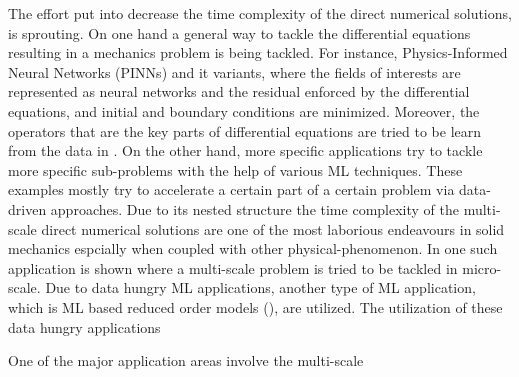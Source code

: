 The effort put into decrease the time complexity of the direct numerical solutions, is sprouting. On one hand a general way to tackle the differential equations resulting in a mechanics problem is being tackled. For instance,  Physics-Informed Neural Networks (PINNs) \cite{raissi2019b} and it variants, where the fields of interests are represented as neural networks and the residual enforced by the differential equations, and initial and boundary conditions are minimized.  Moreover, the operators that are the key parts of differential equations are tried to be learn from the data in \cite{lu2021a}. On the other hand, more specific applications try to tackle more specific sub-problems with the help of various ML techniques. These examples mostly try to accelerate a certain part of a certain problem via data-driven approaches. Due to its nested structure the time complexity of the multi-scale direct numerical solutions are one of the most laborious endeavours in solid mechanics espcially when coupled with other physical-phenomenon. In \cite{bessa2017} one such application is shown where a multi-scale problem is tried to be tackled in micro-scale. Due to data hungry ML applications, another type of ML application, which is ML based reduced order models (\qg \cite{liu2016,ferreira2021}), are utilized. The utilization of these data hungry applications 

One of the major application areas involve the multi-scale 













